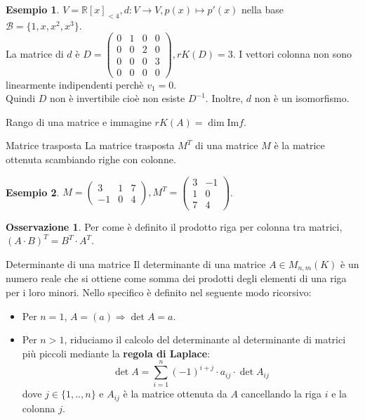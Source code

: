 \documentclass[a4paper]{article}
\theoremstyle{definition}
\newtheorem*{oss}{Osservazione}
\newtheorem*{es}{Esempio}
\begin{document}
\begin{es}
	$V = \mathbb{R}[x]_{< 4}, d: V \rightarrow V, p(x) \mapsto p'(x)$ nella base $\mathcal{B} = \{1, x, x^2, x^3\}$. \\
	La matrice di $d$ è $D = \begin{pmatrix}
			0 & 1 & 0 & 0 \\
			0 & 0 & 2 & 0 \\
			0 & 0 & 0 & 3 \\
			0 & 0 & 0 & 0
		\end{pmatrix}, rK(D) = 3$. I vettori colonna non sono linearmente indipendenti perchè $v_1 = 0$. \\
	Quindi $D$ non è invertibile cioè non esiste $D^{-1}$. Inoltre, $d$ non è un isomorfismo.
\end{es}
\begin{cor}{Rango di una matrice e immagine}{}
	$rK(A) = \dim \text{Im} f$.
\end{cor}
\begin{deff}{Matrice trasposta}{}
	La matrice trasposta $M^T$ di una matrice $M$ è la matrice ottenuta scambiando righe con colonne.
\end{deff}
\begin{es}
	$M = \begin{pmatrix}
			3  & 1 & 7 \\
			-1 & 0 & 4
		\end{pmatrix}, M^T = \begin{pmatrix}
			3 & -1 \\
			1 & 0  \\
			7 & 4
		\end{pmatrix}$.
\end{es}
\begin{oss}
	Per come è definito il prodotto riga per colonna tra matrici, $(A \cdot B)^T = B^T \cdot A^T$.
\end{oss}
\begin{deff}{Determinante di una matrice}{}
	Il determinante di una matrice $A \in M_{n,m}(K)$ è un numero reale che si ottiene come somma dei prodotti degli elementi di una riga per i loro minori.
	Nello specifico è definito nel seguente modo ricorsivo:
	\begin{itemize}
		\item Per $n = 1$, $A = (a) \Rightarrow \det A = a$.
		\item Per $n > 1$, riduciamo il calcolo del determinante al determinante di matrici più piccoli mediante la \textbf{regola di Laplace}:
		      \begin{equation*}
			      \det A = \sum_{i = 1}^{n} (-1)^{i + j} \cdot a_{ij} \cdot \det A_{ij}
		      \end{equation*}
		      dove $j \in \{1, .., n\}$ e $A_{ij}$ è la matrice ottenuta da $A$ cancellando la riga $i$ e la colonna $j$.
	\end{itemize}
\end{deff}
\end{document}

